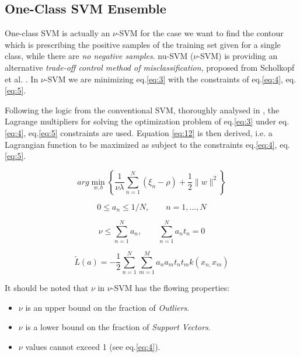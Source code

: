 \subsection{One-Class SVM Ensemble}\label{chap:openset:sec:OCSVM_description}

One-class SVM is actually an $\nu$-SVM for the case we want to find the contour which is prescribing the positive samples of the training set given for a single class, while there are \textit{no negative samples}. nu-SVM ($\nu$-SVM) is providing an alternative \textit{trade-off control method of misclassification}, proposed from Scholkopf et al. . In $\nu$-SVM we are minimizing eq.\ref{eq:3} with the constraints of eq.\ref{eq:4}, eq.\ref{eq:5}.

Following the logic from the conventional SVM, thoroughly analysed in , the Lagrange multipliers for solving the optimization problem of eq.\ref{eq:3} under eq.\ref{eq:4}, eq.\ref{eq:5} constraints are used. Equation \ref{eq:12} is then derived, i.e. a Lagrangian function to be maximized as subject to the constraints eq.\ref{eq:4}, eq.\ref{eq:5}.

\begin{equation}\label{eq:3}
	arg\min_{w,b}\left\{ \frac{1}{\nu\lambda}\sum_{n=1}^{N}(\xi_{n}-\rho)+\frac{1}{2}\|w\|^{2}\right\}
\end{equation}

\begin{equation}\label{eq:4}
	0\leqslant a_{n}\leqslant1/N,\qquad n=1,...,N
\end{equation}

\begin{equation}\label{eq:5}
	\nu\leqslant\sum_{n=1}^{N}a_{n}, \qquad \sum_{n=1}^{N}a_{n}t_{n}=0
\end{equation}

\begin{equation}\label{eq:12}
	\widetilde{L}(a)=-\frac{1}{2}\sum_{n=1}^{N}\sum_{m=1}^{M}a_{n}a_{m}t_{n}t_{m}k(x_{n,}x_{m})
\end{equation}

\newpage


It should be noted that $\nu$ in $\nu$-SVM has the flowing properties:
\begin{itemize}
	\item $\nu$ is an upper bound on the fraction of \textit{Outliers}.
	\item $\nu$ is a lower bound on the fraction of \textit{Support Vectors}.
	\item $\nu$ values cannot exceed 1 (see eq.\ref{eq:4}).
\end{itemize}

